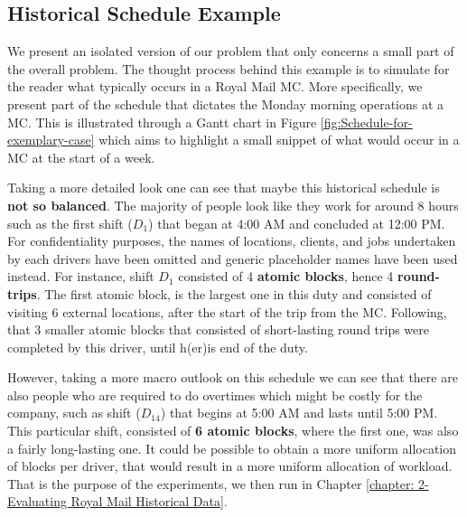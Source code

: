 
\subsection*{Historical Schedule Example}
We present an isolated version of our problem that only concerns a small part of the overall problem. The thought process behind this example is to simulate for the reader what typically occurs in a Royal Mail MC. More specifically, we present part of the schedule that dictates the Monday morning operations at a MC. This is illustrated through a Gantt chart in Figure \ref{fig:Schedule-for-exemplary-case} which aims to highlight a small snippet of what would occur in a MC at the start of a week.

\vspace{\baselineskip}
\noindent
Taking a more detailed look one can see that maybe this historical schedule is \textbf{not so balanced}. The majority of people look like they work for around 8 hours such as the first shift ($D_1$) that began at 4:00 AM and concluded at 12:00 PM. For confidentiality purposes, the names of locations, clients, and jobs undertaken by each drivers have been omitted and generic placeholder names have been used instead. For instance,  shift $D_1$  consisted of 4 \textbf{atomic blocks}, hence 4 \textbf{round-trips}. The first atomic block, is the largest one in this duty and consisted of visiting 6 external locations, after the start of the trip from the MC. Following, that 3 smaller atomic blocks that consisted of short-lasting round trips were completed by this driver, until h(er)is end of the duty.

\vspace{\baselineskip}
\noindent
However, taking a more macro outlook on this schedule we can see that there are also people who are required to do overtimes which might be costly for the company,  such as shift ($D_{14}$) that begins at 5:00 AM and lasts until 5:00 PM. This particular shift, consisted of \textbf{6 atomic blocks}, where the first one, was also a fairly long-lasting one. It could be possible to obtain a more uniform allocation of blocks per driver, that would result in a more uniform allocation of workload. That is the purpose of the experiments, we then run in Chapter \ref{chapter: 2-Evaluating Royal Mail Historical Data}.


